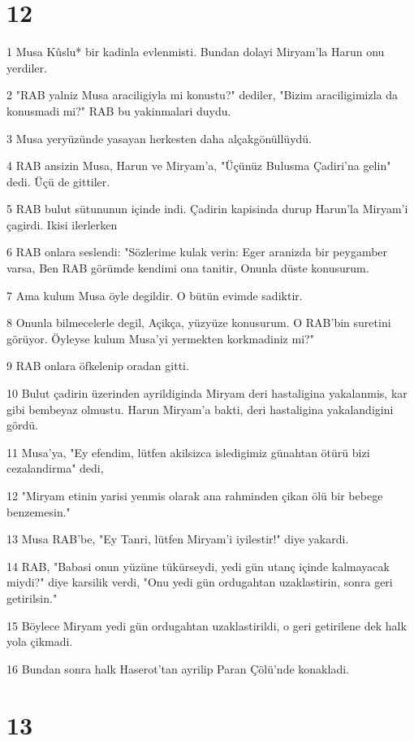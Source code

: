 \chapter{12}

\par 1 Musa Kûslu* bir kadinla evlenmisti. Bundan dolayi Miryam'la Harun onu yerdiler.
\par 2 "RAB yalniz Musa araciligiyla mi konustu?" dediler, "Bizim araciligimizla da konusmadi mi?" RAB bu yakinmalari duydu.
\par 3 Musa yeryüzünde yasayan herkesten daha alçakgönüllüydü.
\par 4 RAB ansizin Musa, Harun ve Miryam'a, "Üçünüz Bulusma Çadiri'na gelin" dedi. Üçü de gittiler.
\par 5 RAB bulut sütununun içinde indi. Çadirin kapisinda durup Harun'la Miryam'i çagirdi. Ikisi ilerlerken
\par 6 RAB onlara seslendi: "Sözlerime kulak verin: Eger aranizda bir peygamber varsa, Ben RAB görümde kendimi ona tanitir, Onunla düste konusurum.
\par 7 Ama kulum Musa öyle degildir. O bütün evimde sadiktir.
\par 8 Onunla bilmecelerle degil, Açikça, yüzyüze konusurum. O RAB'bin suretini görüyor. Öyleyse kulum Musa'yi yermekten korkmadiniz mi?"
\par 9 RAB onlara öfkelenip oradan gitti.
\par 10 Bulut çadirin üzerinden ayrildiginda Miryam deri hastaligina yakalanmis, kar gibi bembeyaz olmustu. Harun Miryam'a bakti, deri hastaligina yakalandigini gördü.
\par 11 Musa'ya, "Ey efendim, lütfen akilsizca isledigimiz günahtan ötürü bizi cezalandirma" dedi,
\par 12 "Miryam etinin yarisi yenmis olarak ana rahminden çikan ölü bir bebege benzemesin."
\par 13 Musa RAB'be, "Ey Tanri, lütfen Miryam'i iyilestir!" diye yakardi.
\par 14 RAB, "Babasi onun yüzüne tükürseydi, yedi gün utanç içinde kalmayacak miydi?" diye karsilik verdi, "Onu yedi gün ordugahtan uzaklastirin, sonra geri getirilsin."
\par 15 Böylece Miryam yedi gün ordugahtan uzaklastirildi, o geri getirilene dek halk yola çikmadi.
\par 16 Bundan sonra halk Haserot'tan ayrilip Paran Çölü'nde konakladi.

\chapter{13}

